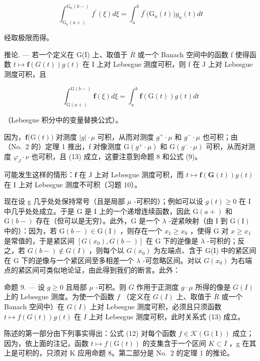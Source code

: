 \[
\int_ {\mathrm{G} _ {n} (a +)} ^ {\mathrm{G} _ {n} (b -)} f ^ {\prime} (\xi) d \xi = \int_ {a} ^ {b} f ^ {\prime} \bigl (\mathrm{G} _ {n} (t) \bigr) g _ {n} (t) d t
\]

经取极限而得。

推论. --- 若一个定义在 G(I) 上、取值于 \(\overline{R}\) 或一个 Banach 空间中的函数 f 使得函数 \(t \mapsto \mathbf{f}(G(t))g(t)\) 在 I 上对 Lebesgue 测度可积，则 f 在 J 上对 Lebesgue 测度可积，且

\[
\int_ {\mathrm{G} (a +)} ^ {\mathrm{G} (b -)} \mathbf {f} (\xi) d \xi = \int_ {a} ^ {b} \mathbf {f} (\mathrm{G} (t)) g (t) d t\tag{13}
\]

（Lebesgue 积分中的变量替换公式）。

因为，\(\mathbf{f}\big(\mathrm{G}(t)\big)\) 对测度 \(|g|\cdot\mu\) 可积，从而对测度 \(g^{+}\cdot\mu\) 和 \(g^{-}\cdot\mu\) 也可积；由（No.~2 的）定理 1 推出，f 对像测度 \(\mathrm{G}(g^{+}\cdot\mu)\) 和 \(\mathrm{G}(g^{-}\cdot\mu)\) 可积，从而对测度 \(\varphi_{J}\cdot\nu\) 也可积，且 (13) 成立，这要注意到命题 8 和公式 (9)。

可能发生这样的情形：\(\mathbf{f}\) 在 J 上对 Lebesgue 测度可积，而 \(t \mapsto \mathbf{f}(\mathbf{G}(t))g(t)\) 在 I 上对 Lebesgue 测度不可积（习题 10）。

现在设 g 几乎处处保持常号（且是局部 \(\mu\) -可积的）；例如可以设 \(g(t) \geqslant 0\) 在 I 中几乎处处成立。于是 G 是 I 上的一个递增连续函数，因此 \(\mathrm{G}(a+)\) 和 \(\mathrm{G}(b-)\) 存在（但可以是无穷）。此外，G 是一个 \(\lambda\) -逆紧映射（由 I 到 \(\mathrm{G}(\mathrm{I})\) 中的）：因为，若 \(\mathrm{G}(b-) \in \mathrm{G}(\mathrm{I})\) ，则存在一个 \(x_{1} \geqslant x_{0}\) ，使得 G 对 \(x \geqslant x_{1}\) 是常值的，于是紧区间 \([G(x_{0}), G(b-)]\) 在 G 下的逆像是 \(\lambda\) -可积的；反之，若 \(G(b-) \notin G(I)\) ，则每个以 \(G(x_{0})\) 为左端点、含于 G(I) 中的紧区间在 G 下的逆像与一个紧区间至多相差一个 \(\lambda\) -可忽略区间。对以 \(G(x_{0})\) 为右端点的紧区间可类似地论证，由此得到我们的断言。此外：

命题 9. --- 设 \(g \geqslant 0\) 且局部 \(\mu\) -可积。则 \(G\) 作用于正测度 \(g \cdot \mu\) 所得的像是 \(G(I)\) 上的 Lebesgue 测度。为使一个函数 \(f\) （定义在 \(G(I)\) 上、取值于 \(\overline{R}\) 或一个 Banach 空间中）在 \(G(I)\) 上对 Lebesgue 测度可积，必须且只须函数 \(t \mapsto f(G(t))g(t)\) 在 \(I\) 上对 Lebesgue 测度可积，此时关系式 (13) 成立。

陈述的第一部分由下列事实得出：公式 (12) 对每个函数 \(f \in \mathcal{K}(\mathrm{G}(\mathrm{I}))\) 成立；因为，依上面的注记，函数 \(t \mapsto f(\mathrm{G}(t))\) 的支集含于一个区间 \(K \subset I\) ，g 在其上是可积的，只须对 K 应用命题 8。第二部分是 No.~2 的定理 1 的推论。


